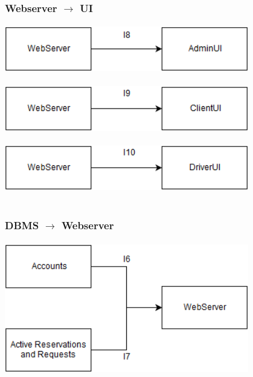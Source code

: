 \documentclass[10pt,xcolor={usenames,dvipsnames}]{beamer}
\begin{document}
\begin{frame}
	\frametitle{Webserver $\rightarrow$ UI}
	\framesubtitle{}
	\begin{center}
		\includegraphics[width=0.8\textwidth,height=0.8\textheight,keepaspectratio]{WSUI3}\\\-\\
		\includegraphics[width=0.8\textwidth,height=0.8\textheight,keepaspectratio]{WSUI1}\\\-\\
		\includegraphics[width=0.8\textwidth,height=0.8\textheight,keepaspectratio]{WSUI2}\\\-\\
	\end{center}
\end{frame}
\begin{frame}
	\frametitle{DBMS $\rightarrow$ Webserver}
	\framesubtitle{}
		\includegraphics[width=0.8\textwidth,height=0.8\textheight,keepaspectratio]{DBWS}
\end{frame}

\end{document}
